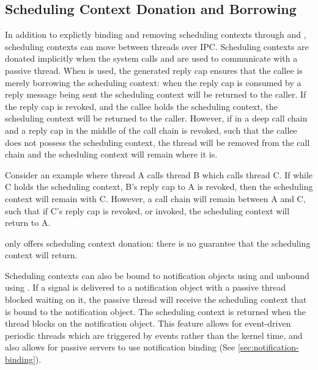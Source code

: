 \subsection{Scheduling Context Donation and Borrowing}

In addition to explictly binding and removing scheduling contexts through  and , scheduling contexts can move between threads over IPC.
Scheduling contexts are donated implicitly when the system calls  and  are used to communicate with a passive thread.
When  is used, the generated reply cap ensures that the callee is merely borrowing the scheduling context: when the reply cap is consumed by a reply message being sent the scheduling context will be returned to the caller.
If the reply cap is revoked, and the callee holds the scheduling context, the scheduling context will be returned to the caller. 
However, if in a deep call chain and a reply cap in the middle of the call chain is revoked, such that the callee does not possess the scheduling context, the thread will be removed from the call chain and the scheduling context will remain where it is. 

Consider an example where thread A calls thread B which calls thread C. 
If while C holds the scheduling context, B's reply cap to A is revoked, then the scheduling context will remain with C. 
However, a call chain will remain between A and C, such that if C's reply cap is revoked, or invoked, the scheduling context will return to A.

 only offers scheduling context donation: there is no guarantee that the scheduling context will return.

Scheduling contexts can also be bound to notification objects using  and unbound using .
If a signal is delivered to a notification object with a passive thread blocked waiting on it, the passive thread will receive the scheduling context that is bound to the notification object.
The scheduling context is returned when the thread blocks on the notification object. 
This feature allows for event-driven periodic threads which are triggered by events rather than the kernel time, and also allows for passive servers to use notification binding (See \autoref{sec:notification-binding}).

